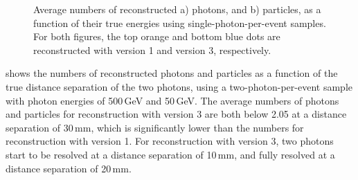 \begin{figure}[tbph]
\begin{subfigure}[b]{0.45\textwidth}
        \caption{}
        \label{fig:photonSingleN_all}
    \end{subfigure}
\caption[Average number of reconstructed photons and reconstructed particles, as a function of their true energy using single photon sample.]
{Average numbers of reconstructed a) photons, and b) particles, as a function of their true energies using single-photon-per-event samples. For both figures, the top orange and bottom blue dots are reconstructed with \pandora version 1 and version 3, respectively.}
\label{fig:photonSingleN}
\end{figure}


 shows the numbers of reconstructed photons and particles as a function of  the true distance separation of the two photons, using a two-photon-per-event sample with photon energies of  500\,GeV and 50\,GeV.  The average numbers of photons and particles for reconstruction with \pandora version 3 are both below 2.05 at a distance separation of 30\,mm, which is significantly lower than the numbers for reconstruction with \pandora version 1. For reconstruction with \pandora version 3, two photons start to be resolved at a distance separation of 10\,mm, and fully resolved at a distance separation of 20\,mm.






